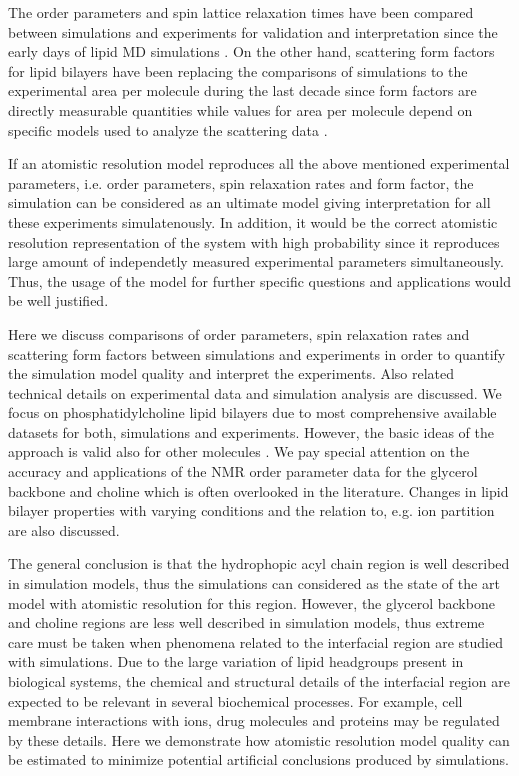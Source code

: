 \documentclass[aps,prl,superscriptaddress,twocolumn]{revtex4}
\begin{document}
The order parameters and spin lattice relaxation times have been compared between simulations
and experiments for validation and interpretation since the early days of lipid MD simulations \cite{ploeg82,pastor88}.
On the other hand, scattering form factors for lipid bilayers have been replacing the 
comparisons of simulations to the experimental area per molecule during the last decade
since form factors are directly measurable quantities while values for area per molecule depend on specific
models used to analyze the scattering data \cite{nagle00}.

If an atomistic resolution model reproduces all the above mentioned experimental parameters,
i.e. order parameters, spin relaxation rates and form factor, the simulation can be considered
as an ultimate model giving interpretation for all these experiments simulatenously.
In addition, it would be the correct atomistic resolution representation of the system with high
probability since it reproduces large amount of independetly measured experimental parameters 
simultaneously. Thus, the usage of the model for further specific questions and applications would be well justified.

Here we discuss comparisons of order parameters, spin relaxation rates
and scattering form factors between simulations and experiments in order to quantify the 
simulation model quality and interpret the experiments. Also related technical details on experimental
data and simulation analysis are discussed. We focus on phosphatidylcholine lipid
bilayers due to most comprehensive available datasets for both, simulations and experiments.
However, the basic ideas of the approach is valid also for other molecules \cite{wohlgemuth80,kapla12,pan12,kucerka12,nowacka13,pan14,boscia14,ferreira14}. 
We pay special attention on the accuracy and applications of the NMR order parameter data 
for the glycerol backbone and choline which is often overlooked in the literature.
Changes in lipid bilayer properties with varying conditions and the relation
to, e.g. ion partition are also discussed.

 
The general conclusion is that the hydrophopic acyl chain region is well described
in simulation models, thus the simulations can considered as the state of the art model
with atomistic resolution for this region. However, the glycerol backbone and choline regions are 
less well described in simulation models, thus extreme care must be taken when phenomena
related to the interfacial region are studied with simulations. Due to the large variation of lipid 
headgroups present in biological systems, the chemical and structural details of the interfacial
region are expected to be relevant in several biochemical processes. For example, 
cell membrane interactions with ions, drug molecules and proteins may be regulated by these
details. Here we demonstrate how atomistic resolution model quality can be estimated to minimize 
potential artificial conclusions produced by simulations.
\end{document}
